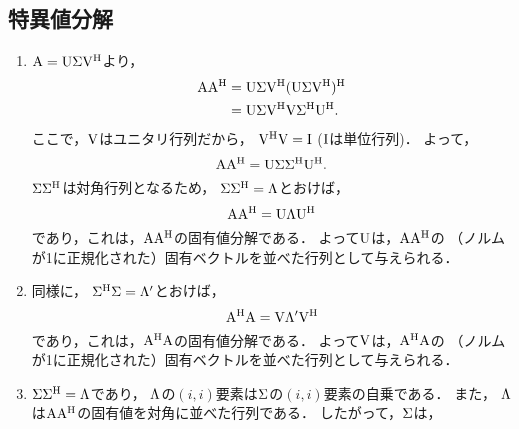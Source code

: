   \subsection{特異値分解}
    \begin{enumerate}[label=(\roman*)]
      \item $\mathrm{A} = \mathrm{U}\mathrm{\Sigma}\mathrm{V}^\mathrm{H}$より，
        \begin{align}
          \mathrm{A}\mathrm{A}^\mathrm{H} &= \mathrm{U}\mathrm{\Sigma}\mathrm{V}^\mathrm{H}(\mathrm{U}\mathrm{\Sigma}\mathrm{V}^\mathrm{H})^\mathrm{H} \\
            &= \mathrm{U}\mathrm{\Sigma}\mathrm{V}^\mathrm{H}\mathrm{V}\mathrm{\Sigma}^\mathrm{H}\mathrm{U}^\mathrm{H}.
        \end{align}
        ここで，$\mathrm{V}$はユニタリ行列だから，
        $\mathrm{V}^\mathrm{H}\mathrm{V} = \mathrm{I}$ ($\mathrm{I}$は単位行列)．
        よって，
        \begin{equation}
          \mathrm{A}\mathrm{A}^\mathrm{H} = \mathrm{U}\mathrm{\Sigma}\mathrm{\Sigma}^\mathrm{H}\mathrm{U}^\mathrm{H}.
        \end{equation}
        $\mathrm{\Sigma}\mathrm{\Sigma}^\mathrm{H}$は対角行列となるため，
        $\mathrm{\Sigma}\mathrm{\Sigma}^\mathrm{H} = \mathrm{\Lambda}$とおけば，
        \begin{equation}
          \mathrm{A}\mathrm{A}^\mathrm{H} = \mathrm{U}\mathrm{\Lambda}\mathrm{U}^\mathrm{H}
        \end{equation}
        であり，これは，$\mathrm{A}\mathrm{A}^\mathrm{H}$の固有値分解である．
        よって$\mathrm{U}$は，$\mathrm{A}\mathrm{A}^\mathrm{H}$の
        （ノルムが1に正規化された）固有ベクトルを並べた行列として与えられる．
      \item 同様に，
        $\mathrm{\Sigma}^\mathrm{H}\mathrm{\Sigma} = \mathrm{\Lambda}'$とおけば，
        \begin{equation}
          \mathrm{A}^\mathrm{H}\mathrm{A} = \mathrm{V}\mathrm{\Lambda}'\mathrm{V}^\mathrm{H}
        \end{equation}
        であり，これは，$\mathrm{A}^\mathrm{H}\mathrm{A}$の固有値分解である．
        よって$\mathrm{V}$は，$\mathrm{A}^\mathrm{H}\mathrm{A}$の
        （ノルムが1に正規化された）固有ベクトルを並べた行列として与えられる．
      \item $\mathrm{\Sigma}\mathrm{\Sigma}^\mathrm{H} = \mathrm{\Lambda}$であり，
        $\mathrm{\Lambda}$の$(i, i)$要素は$\mathrm{\Sigma}$の$(i, i)$要素の自乗である．
        また，
        $\mathrm{\Lambda}$は$\mathrm{A}\mathrm{A}^\mathrm{H}$の固有値を対角に並べた行列である．
        したがって，$\mathrm{\Sigma}$は，

\end{enumerate}
